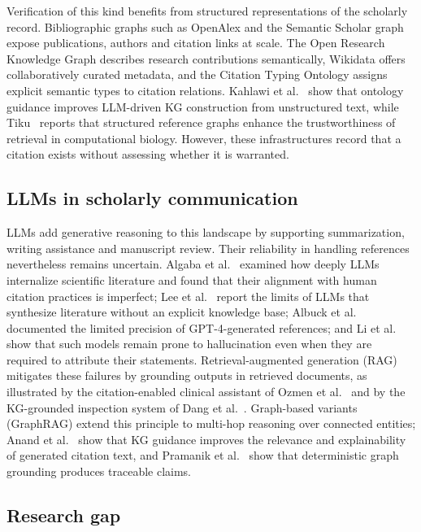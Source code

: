 \documentclass[lettersize,journal]{IEEEtran}
\begin{document}
Verification of this kind benefits from structured representations of the scholarly record. Bibliographic graphs such as OpenAlex and the Semantic Scholar graph expose publications, authors and citation links at scale. The Open Research Knowledge Graph describes research contributions semantically, Wikidata offers collaboratively curated metadata, and the Citation Typing Ontology assigns explicit semantic types to citation relations. Kahlawi et al.~\cite{kahlawi2026ontology} show that ontology guidance improves LLM-driven KG construction from unstructured text, while Tiku~\cite{tiku2025benchmarking} reports that structured reference graphs enhance the trustworthiness of retrieval in computational biology. However, these infrastructures record that a citation exists without assessing whether it is warranted.

\subsection{LLMs in scholarly communication}

LLMs add generative reasoning to this landscape by supporting summarization, writing assistance and manuscript review. Their reliability in handling references nevertheless remains uncertain. Algaba et al.~\cite{algaba2026how} examined how deeply LLMs internalize scientific literature and found that their alignment with human citation practices is imperfect; Lee et al.~\cite{lee2026can} report the limits of LLMs that synthesize literature without an explicit knowledge base; Albuck et al.~\cite{albuck2024precision} documented the limited precision of GPT-4-generated references; and Li et al.~\cite{li2024verifiable} show that such models remain prone to hallucination even when they are required to attribute their statements. Retrieval-augmented generation (RAG) mitigates these failures by grounding outputs in retrieved documents, as illustrated by the citation-enabled clinical assistant of Ozmen et al.~\cite{ozmen2026specialty} and by the KG-grounded inspection system of Dang et al.~\cite{dang2026intelligent}. Graph-based variants (GraphRAG) extend this principle to multi-hop reasoning over connected entities; Anand et al.~\cite{anand2023ctg} show that KG guidance improves the relevance and explainability of generated citation text, and Pramanik et al.~\cite{pramanik2026mechanistic} show that deterministic graph grounding produces traceable claims.

\subsection{Research gap}
\end{document}
